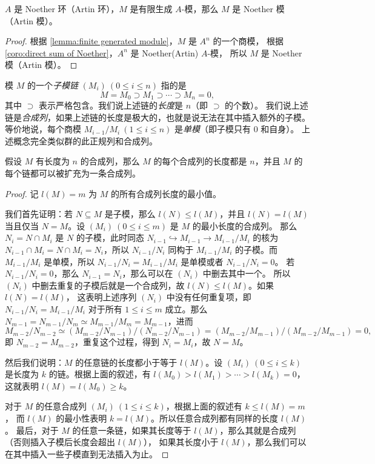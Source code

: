 \begin{proposition}\label{prop:f.g. module is Noether}
  $A$ 是 Noether 环（Artin 环），$M$ 是有限生成 $A$-模，那么 $M$ 是 Noether 模（Artin 模）。
\end{proposition}
\begin{proof}
  根据 \autoref{lemma:finite generated module}，$M$ 是 $A^n$ 的一个商模，
  根据 \autoref{coro:direct sum of Noether}，$A^n$ 是 Noether(Artin) $A$-模，
  所以 $M$ 是 Noether 模（Artin 模）。
\end{proof}

模 $M$ 的一个\emph{子模链} $(M_i)\ (0\leq i\leq n)$ 指的是
\[
  M=M_0\supset M_1\supset \cdots\supset M_n=0,
\]
其中 $\supset$ 表示严格包含。我们说上述链的\emph{长度}是 $n$（即 $\supset$ 的个数）。
我们说上述链是\emph{合成列}，如果上述链的长度是极大的，也就是说无法在其中插入额外的子模。
等价地说，每个商模 $M_{i-1}/M_i\ (1\leq i\leq n)$ 是\emph{单模}（即子模只有 $0$ 和自身）。
上述概念完全类似群的此正规列和合成列。

\begin{proposition}
  假设 $M$ 有长度为 $n$ 的合成列，那么 $M$ 的每个合成列的长度都是 $n$，并且
  $M$ 的每个链都可以被扩充为一条合成列。
\end{proposition}
\begin{proof}
  记 $l(M)=m$ 为 $M$ 的所有合成列长度的最小值。

  我们首先证明：若 $N\subseteq M$ 是子模，那么 $l(N)\leq l(M)$，并且 $l(N)=l(M)$
  当且仅当 $N=M$。设 $(M_i)\ (0\leq i\le m)$ 是 $M$ 的最小长度的合成列。
  那么 $N_i=N\cap M_i$ 是 $N$ 的子模，此时同态 $N_{i-1}\hookrightarrow M_{i-1}\to M_{i-1}/M_i$
  的核为 $N_{i-1}\cap M_i=N\cap M_i=N_i$，所以 $N_{i-1}/N_i$ 同构于 $M_{i-1}/M_i$
  的子模。而 $M_{i-1}/M_i$ 是单模，所以 $N_{i-1}/N_i=M_{i-1}/M_i$ 是单模或者 $N_{i-1}/N_i=0$。
  若 $N_{i-1}/N_i=0$，那么 $N_{i-1}=N_i$，那么可以在 $(N_i)$ 中删去其中一个。
  所以 $(N_i)$ 中删去重复的子模后就是一个合成列，故 $l(N)\leq l(M)$。如果 $l(N)=l(M)$，
  这表明上述序列 $(N_i)$ 中没有任何重复项，即 $N_{i-1}/N_i=M_{i-1}/M_i$ 对于所有 $1\leq i\leq m$
  成立。那么 $N_{m-1}=N_{m-1}/N_m\simeq M_{m-1}/M_m=M_{m-1}$，进而 
  \[
    M_{m-2}/N_{m-2}\simeq (M_{m-2}/N_{m-1})\big/(N_{m-2}/N_{m-1})
    =(M_{m-2}/M_{m-1})\big/(M_{m-2}/M_{m-1})=0,
  \]
  即 $N_{m-2}=M_{m-2}$，重复这个过程，得到 $N_i=M_i$，故 $N=M$。

  然后我们说明：$M$ 的任意链的长度都小于等于 $l(M)$。设 $(M_i)\ (0\leq i\leq k)$ 是长度为 $k$
  的链。根据上面的叙述，有 $l(M_0)>l(M_1)>\cdots>l(M_k)=0$，这就表明 $l(M)=l(M_0)\geq k$。

  对于 $M$ 的任意合成列 $(M_i)\ (1\leq i\leq k)$，根据上面的叙述有 $k\leq l(M)=m$，
  而 $l(M)$ 的最小性表明 $k=l(M)$。所以任意合成列都有同样的长度 $l(M)$。
  最后，对于 $M$ 的任意一条链，如果其长度等于 $l(M)$，那么其就是合成列（否则插入子模后长度会超出 $l(M)$），
  如果其长度小于 $l(M)$，那么我们可以在其中插入一些子模直到无法插入为止。
\end{proof}

